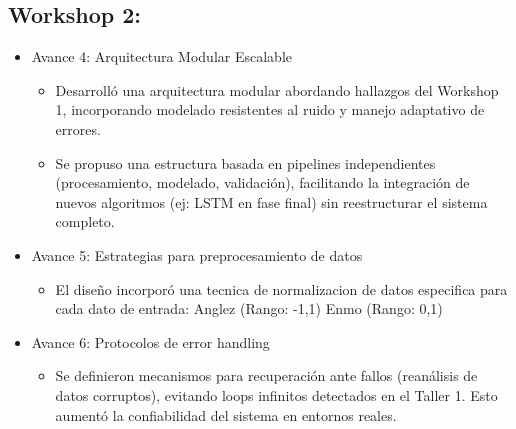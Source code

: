 \documentclass[conference]{IEEEtran}
\begin{document}
\subsection{Workshop 2:}
\begin{itemize}
\item Avance 4: Arquitectura Modular Escalable   
    \begin{itemize}
    \item Desarrolló una arquitectura modular abordando hallazgos del Workshop 1, incorporando modelado resistentes al ruido y manejo adaptativo de errores.
    \item Se propuso una estructura basada en pipelines independientes (procesamiento, modelado, validación), facilitando la integración de nuevos algoritmos (ej: LSTM en fase final) sin reestructurar el sistema completo.
    \end{itemize}
\item Avance 5: Estrategias para preprocesamiento de datos
    \begin{itemize}
    \item El diseño incorporó una tecnica de normalizacion de datos especifica para cada dato de entrada: Anglez (Rango: -1,1) Enmo (Rango: 0,1)
    \end{itemize}
\item Avance 6: Protocolos de error handling
    \begin{itemize}
    \item Se definieron mecanismos para recuperación ante fallos (reanálisis de datos corruptos), evitando loops infinitos detectados en el Taller 1. Esto aumentó la confiabilidad del sistema en entornos reales.
    \end{itemize}
\end{itemize}
\end{document}
